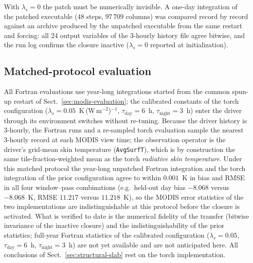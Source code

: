 With $\lambda_s = 0$ the patch must be numerically invisible. A one-day
integration of the patched executable (48 steps, 97\,709 columns) was
compared record by record against an archive produced by the unpatched
executable from the same restart and forcing: all 24 output variables of
the 3-hourly history file agree bitwise, and the run log confirms the
closure inactive ($\lambda_s = 0$ reported at initialization).

\subsection{Matched-protocol evaluation}

All Fortran evaluations use year-long integrations started from the common
spun-up restart of Sect.~\ref{sec:modis-evaluation}; the calibrated
constants of the torch configuration ($\lambda_s =
0.05$~K\,(W\,m$^{-2}$)$^{-1}$, $\tau_{\mathrm{day}} = 6$~h,
$\tau_{\mathrm{night}} = 3$~h) enter the driver through its environment
switches without re-tuning. Because the driver history is 3-hourly, the
Fortran runs and a re-sampled torch evaluation sample the nearest
3-hourly record at each MODIS view time; the observation operator is the
driver's grid-mean skin temperature (\texttt{AvgSurfT}), which is by
construction the same tile-fraction-weighted mean as the torch
\emph{radiative skin temperature}. Under this matched protocol the
year-long unpatched Fortran integration and the torch integration of the
prior configuration agree to within $0.001$~K in bias and RMSE in all four
window--pass combinations (e.g.\ held-out day bias $-8.068$ versus
$-8.068$~K, RMSE $11.217$ versus $11.218$~K), so the MODIS error
statistics of the two implementations are indistinguishable at this
protocol before the closure is activated. What is verified to date is the
numerical fidelity of the transfer (bitwise invariance of the inactive
closure) and the indistinguishability of the prior statistics; full-year
Fortran statistics of the calibrated configuration ($\lambda_s = 0.05$,
$\tau_{\mathrm{day}} = 6$~h, $\tau_{\mathrm{night}} = 3$~h) are not yet
available and are not anticipated here. All conclusions of
Sect.~\ref{sec:structural-slab} rest on the torch implementation.
